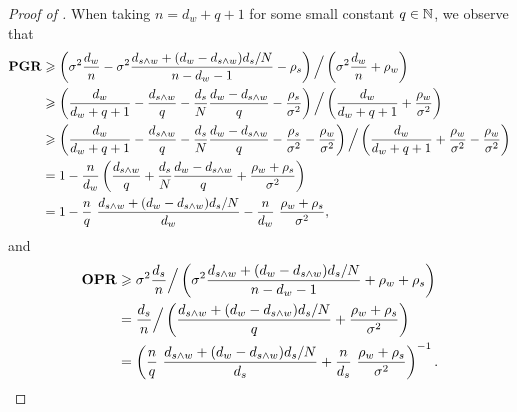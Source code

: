 \begin{proof}[Proof of ]
    When taking $n = d_w + q + 1$ for some small constant $q \in \mathbb{N}$, we observe that 
    \begin{align*}
        \mathbf{PGR} &\geqslant \left(\sigma^2 \frac{d_w}{n} - \sigma^2 \frac{d_{s \wedge w} + (d_w - d_{s \wedge w}) {d_s}/{N}}{n-d_w-1} - \rho_s\right) \Big/ \left(\sigma^2 \frac{d_w}{n} + \rho_w\right) \\
        &\geqslant \left(\frac{d_w}{d_w + q + 1} - \frac{d_{s \wedge w}}{q} - \frac{d_s}{N} \frac{d_w - d_{s \wedge w}}{q} - \frac{\rho_s}{\sigma^2}\right) \Big/ \left(\frac{d_w}{d_w + q + 1} + \frac{\rho_w}{\sigma^2}\right) \\
        &\geqslant \left(\frac{d_w}{d_w + q + 1} - \frac{d_{s \wedge w}}{q} - \frac{d_s}{N} \frac{d_w - d_{s \wedge w}}{q} - \frac{\rho_s}{\sigma^2} - \frac{\rho_w}{\sigma^2}\right) \Big/ \left(\frac{d_w}{d_w + q + 1} + \frac{\rho_w}{\sigma^2} - \frac{\rho_w}{\sigma^2}\right) \\
        &= 1 - \frac{n}{d_w} \left(\frac{d_{s \wedge w}}{q} + \frac{d_s}{N} \frac{d_w - d_{s \wedge w}}{q} + \frac{\rho_w + \rho_s}{\sigma^2}\right) \\
        &= 1 - \frac{n}{q}\ {\frac{d_{s \wedge w} + (d_w - d_{s \wedge w}) d_s / N}{d_w}} - \frac{n}{d_w}\ {\frac{\rho_w + \rho_s}{\sigma^2}},
    \end{align*}
    and
    \begin{align*}
        \mathbf{OPR} &\geqslant \sigma^2 \frac{d_s}{n} \Big/ \left(\sigma^2 \frac{d_{s \wedge w} + (d_w - d_{s \wedge w}) {d_s}/{N}}{n-d_w-1} + \rho_w + \rho_s\right) \\
        &= \frac{d_s}{n} \Big/ \left(\frac{d_{s \wedge w} + (d_w - d_{s \wedge w}) {d_s}/{N}}{q} + \frac{\rho_w + \rho_s}{\sigma^2}\right) \\
        &= \left(\frac{n}{q}\ \frac{d_{s \wedge w} + (d_w - d_{s \wedge w}) {d_s}/{N}}{d_s} + \frac{n}{d_s}\ \frac{\rho_w + \rho_s}{\sigma^2}\right)^{-1}.
    \end{align*}
\end{proof}




